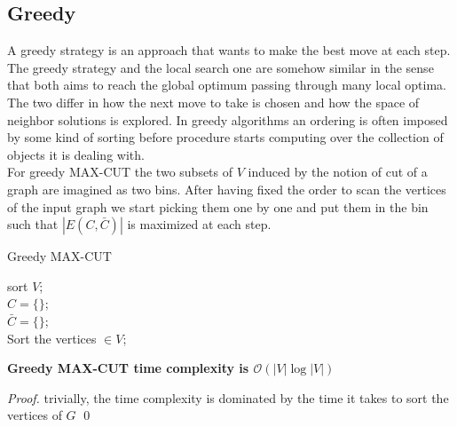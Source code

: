 
\subsection{Greedy}
A greedy strategy is an approach that wants to make the best move at each step.
The greedy strategy and the local search one are somehow similar in the sense that both aims to reach the global optimum passing through many local optima.
The two differ in how the next move to take is chosen and how the space of neighbor solutions is explored.
In greedy algorithms an ordering is often imposed by some kind of sorting before procedure starts computing over the collection of objects it is dealing with.\\
For greedy MAX-CUT the two subsets of $V$ induced by the notion of cut of a graph are imagined as two bins. After having fixed the order to scan the vertices of the input graph we start picking them one by one and put them in the bin such that $ |E(C,\bar{C})| $ is maximized at each step.\\

\begin{algorithm}[H]
	\SetAlgoLined
	\caption{Greedy MAX-CUT}
	sort $ V $;\\
	$C =\{\}$;\\
	$\bar{C} =\{\}$;\\
	Sort the vertices $ \in V $;\\
\end{algorithm}
\bigskip

\begin{theorem}
  \textbf{Greedy MAX-CUT time complexity is  $\mathcal{O}( |V|\log |V|)$}
\end{theorem}
\begin{proof}
  trivially, the time complexity is dominated by the time it takes to sort the vertices of $ G $
  \qed
\end{proof}

